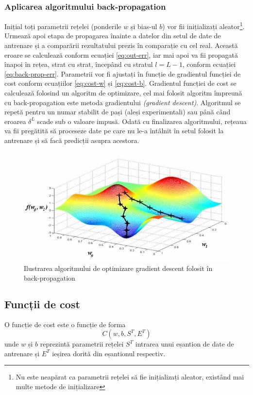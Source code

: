 \subsubsection*{Aplicarea algoritmului back-propagation}
Inițial toți parametrii rețelei (ponderile $w$ și bias-ul $b$) vor fii inițializați aleator\footnote{Nu este neapărat ca parametrii rețelei să fie inițializați aleator, existând mai multe metode de inițializare}. Urmează apoi etapa de propagarea înainte a datelor din setul de date de antrenare și a comparării rezultatului prezis în comparație cu cel real. Această eroare se calculează conform ecuației \eqref{eq:out-err}, iar mai apoi va fii propagată înapoi în rețea, strat cu strat, începând cu stratul $l = L-1$, conform ecuației \eqref{eq:back-prop-err}. Parametrii vor fi ajustați în funcție de gradientul funcției de cost conform ecuațiilor \eqref{eq:cost-w} și \eqref{eq:cost-b}. Gradientul funcției de cost se calculează folosind un algoritm de optimizare, cel mai folosit algoritm împreună cu back-propagation este metoda gradientului \textit{(gradient descent)}. Algoritmul se repetă pentru un numar stabilit de pași (aleși experimentali) sau până când eroarea $\delta^L$ scade sub o valoare impusă. Odată cu finalizarea algoritmului, rețeaua va fii pregătită să proceseze date pe care nu le-a întâlnit în setul folosit la antrenare și să facă predicții asupra acestora.
\begin{figure}[ht]
\centering
\includegraphics[width=12cm, keepaspectratio]{fig/cap2/grad-desc.jpg}
\caption{Ilustrarea algoritmului de optimizare gradient descent folosit în back-propagation\cite{vrejoiu:2019}}
\end{figure}

\subsection{Funcții de cost}\label{subch:f-cost}
O funcție de cost este o funcție de forma \cite{neuralnetbook:2015}
\begin{equation}
C(w,b,S^T,E^T)
\label{eq:cost-form}
\end{equation}
unde $w$ și $b$ reprezintă parametrii rețelei $S^T$ intrarea unui eșantion de date de antrenare și $E^T$ ieșirea dorită din eșantionul respectiv.

